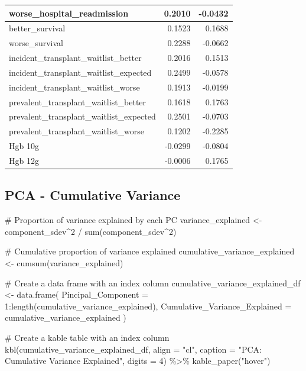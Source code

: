 \documentclass[
  letterpaper,
  DIV=11,
  numbers=noendperiod]{scrreprt}
\newenvironment{Shaded}{\begin{snugshade}}{\end{snugshade}}
\newcommand{\AttributeTok}[1]{\textcolor[rgb]{0.40,0.45,0.13}{#1}}
\newcommand{\CommentTok}[1]{\textcolor[rgb]{0.37,0.37,0.37}{#1}}
\newcommand{\DecValTok}[1]{\textcolor[rgb]{0.68,0.00,0.00}{#1}}
\newcommand{\FunctionTok}[1]{\textcolor[rgb]{0.28,0.35,0.67}{#1}}
\newcommand{\NormalTok}[1]{\textcolor[rgb]{0.00,0.23,0.31}{#1}}
\newcommand{\OtherTok}[1]{\textcolor[rgb]{0.00,0.23,0.31}{#1}}
\newcommand{\SpecialCharTok}[1]{\textcolor[rgb]{0.37,0.37,0.37}{#1}}
\newcommand{\StringTok}[1]{\textcolor[rgb]{0.13,0.47,0.30}{#1}}
\begin{document}
\begin{table}
\begin{tabular}[t]{l|r|r}
worse\_hospital\_readmission & 0.2010 & -0.0432\\
\hline
better\_survival & 0.1523 & 0.1688\\
\hline
worse\_survival & 0.2288 & -0.0662\\
\hline
incident\_transplant\_waitlist\_better & 0.2016 & 0.1513\\
\hline
incident\_transplant\_waitlist\_expected & 0.2499 & -0.0578\\
\hline
incident\_transplant\_waitlist\_worse & 0.1913 & -0.0199\\
\hline
prevalent\_transplant\_waitlist\_better & 0.1618 & 0.1763\\
\hline
prevalent\_transplant\_waitlist\_expected & 0.2501 & -0.0703\\
\hline
prevalent\_transplant\_waitlist\_worse & 0.1202 & -0.2285\\
\hline
Hgb 10g & -0.0299 & -0.0804\\
\hline
Hgb 12g & -0.0006 & 0.1765\\
\hline
\end{tabular}
\end{table}

\hypertarget{pca---cumulative-variance}{%
\subsection{PCA - Cumulative Variance}\label{pca---cumulative-variance}}

\begin{Shaded}
\begin{Highlighting}[]
\CommentTok{\# Proportion of variance explained by each PC}
\NormalTok{variance\_explained }\OtherTok{\textless{}{-}}\NormalTok{ component\_sdev}\SpecialCharTok{\^{}}\DecValTok{2} \SpecialCharTok{/} \FunctionTok{sum}\NormalTok{(component\_sdev}\SpecialCharTok{\^{}}\DecValTok{2}\NormalTok{)}

\CommentTok{\# Cumulative proportion of variance explained}
\NormalTok{cumulative\_variance\_explained }\OtherTok{\textless{}{-}} \FunctionTok{cumsum}\NormalTok{(variance\_explained)}

\CommentTok{\# Create a data frame with an index column}
\NormalTok{cumulative\_variance\_explained\_df }\OtherTok{\textless{}{-}} \FunctionTok{data.frame}\NormalTok{(}
  \AttributeTok{Pincipal\_Component =} \DecValTok{1}\SpecialCharTok{:}\FunctionTok{length}\NormalTok{(cumulative\_variance\_explained),}
  \AttributeTok{Cumulative\_Variance\_Explained =}\NormalTok{ cumulative\_variance\_explained}
\NormalTok{)}

\CommentTok{\# Create a kable table with an index column}
\FunctionTok{kbl}\NormalTok{(cumulative\_variance\_explained\_df, }\AttributeTok{align =} \StringTok{"cl"}\NormalTok{,}
    \AttributeTok{caption =} \StringTok{"PCA: Cumulative Variance Explained"}\NormalTok{,}
    \AttributeTok{digits =} \DecValTok{4}\NormalTok{) }\SpecialCharTok{\%\textgreater{}\%}
  \FunctionTok{kable\_paper}\NormalTok{(}\StringTok{"hover"}\NormalTok{)}
\end{Highlighting}
\end{Shaded}
\end{document}
